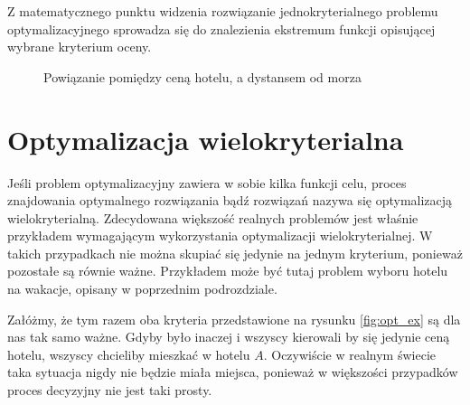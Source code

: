 \documentclass[twoside]{iisthesis}
\begin{document}
Z matematycznego punktu widzenia rozwiązanie jednokryterialnego problemu optymalizacyjnego sprowadza się do znalezienia ekstremum  funkcji opisującej wybrane kryterium oceny.
\begin{figure}[!htb]
	\centering
	\caption{Powiązanie pomiędzy ceną hotelu, a dystansem od morza}
	\label{fig:opt_ex}
\end{figure}
\section{Optymalizacja wielokryterialna}
Jeśli problem optymalizacyjny zawiera w sobie kilka funkcji celu, proces znajdowania optymalnego rozwiązania bądź rozwiązań nazywa się optymalizacją wielokryterialną. Zdecydowana większość realnych problemów jest właśnie przykładem wymagającym wykorzystania optymalizacji wielokryterialnej. W takich przypadkach nie można skupiać się jedynie na jednym kryterium, ponieważ pozostałe są równie ważne. Przykładem może być tutaj problem wyboru hotelu na wakacje, opisany w poprzednim podrozdziale. 

Załóżmy, że tym razem oba kryteria przedstawione na rysunku \eqref{fig:opt_ex} są dla nas tak samo ważne. Gdyby było inaczej i wszyscy kierowali by się jedynie ceną hotelu, wszyscy chcieliby mieszkać w hotelu $A$. Oczywiście w realnym świecie taka sytuacja nigdy nie będzie miała miejsca, ponieważ w większości przypadków proces decyzyjny nie jest taki prosty.
\end{document}
